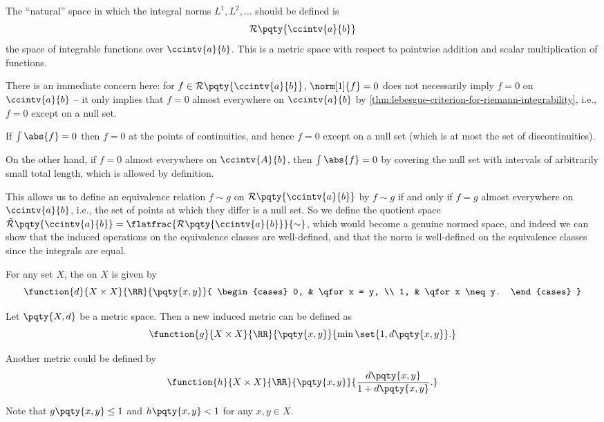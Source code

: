 \small

The ``natural'' space in which the integral norms \(L^1, L^2, \ldots\) should be defined is
\[
    \mathcal{R} \pqty{\ccintv{a}{b}}
\]
the space of integrable functions over \(\ccintv{a}{b}\). This is a metric space with respect to pointwise addition and scalar multiplication of functions.

There is an immediate concern here: for \(f \in \mathcal{R} \pqty{\ccintv{a}{b}}\), \(\norm[1]{f} = 0\) does not necessarily imply \(f = 0\) on \(\ccintv{a}{b}\) -- it only implies that \(f = 0\) almost everywhere on \(\ccintv{a}{b}\) by \autoref{thm:lebesgue-criterion-for-riemann-integrability}, i.e., \(f = 0\) except on a null set.

If \(\int \abs{f} = 0\) then \(f = 0\) at the points of continuities, and hence \(f = 0\) except on a null set (which is at most the set of discontinuities).

On the other hand, if \(f = 0\) almost everywhere on \(\ccintv{A}{b}\), then \(\int \abs{f} = 0\) by covering the null set with intervals of arbitrarily small total length, which is allowed by definition.

This allows us to define an equivalence relation \(f \sim g\) on \(\mathcal{R} \pqty{\ccintv{a}{b}}\) by \(f \sim g\) if and only if \(f = g\) almost everywhere on \(\ccintv{a}{b}\), i.e., the set of points at which they differ is a null set. So we define the quotient space \(\tilde{\mathcal{R}}\pqty{\ccintv{a}{b}} = \flatfrac{\mathcal{R} \pqty{\ccintv{a}{b}}}{\sim}\), which would become a genuine normed space, and indeed we can show that the induced operations on the equivalence classes are well-defined, and that the norm is well-defined on the equivalence classes since the integrals are equal.

\normalsize

\begin{definition}
    For any set \(X\), the  on \(X\) is given by
    \[
        \function{d}{X \times X}{\RR}{\pqty{x, y}}{
            \begin{cases}
                0, & \qfor x = y, \\
                1, & \qfor x \neq y.
            \end{cases}
        }
    \]
\end{definition}

\begin{example}
    Let \(\pqty{X, d}\) be a metric space. Then a new induced metric can be defined as
    \[
        \function{g}{X \times X}{\RR}{\pqty{x, y}}{\min\set{1, d\pqty{x, y}}.}
    \]

    Another metric could be defined by
    \[
        \function{h}{X \times X}{\RR}{\pqty{x, y}}{\frac{d\pqty{x, y}}{1 + d\pqty{x, y}}.}
    \]

    Note that \(g\pqty{x, y} \leq 1\) and \(h\pqty{x, y} < 1\) for any \(x, y \in X\).
\end{example}

